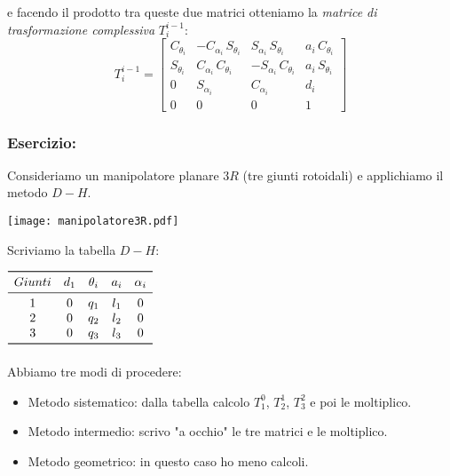 e facendo il prodotto tra queste due matrici otteniamo la \emph{matrice di trasformazione complessiva} $T_i^{i-1}$:
\begin{equation}
	T_i^{i-1} = 
	\begin{bmatrix}
		C_{\theta_i} & -C_{\alpha_i}\,S_{\theta_i} & S_{\alpha_i}\,S_{\theta_i} & a_i\,C_{\theta_i} \\
		S_{\theta_i} & C_{\alpha_i}\,C_{\theta_i} & -S_{\alpha_i}\,C_{\theta_i} & a_i\,S_{\theta_i} \\
		0 & S_{\alpha_i} & C_{\alpha_i} & d_i \\
		0 & 0 & 0 & 1
	\end{bmatrix}
\end{equation}

\subsubsection{Esercizio:}
Consideriamo un manipolatore planare $3R$ (tre giunti rotoidali) e applichiamo il metodo $D-H$.

\texttt{[image: manipolatore3R.pdf]}

Scriviamo la tabella $D-H$:\\
\begin{center}
$
\begin{array}{ccccc}
\toprule
Giunti & d_1 & \theta_i & a_i & \alpha_i \\
\midrule
1 & 0 & q_1 & l_1 & 0 \\
2 & 0 & q_2 & l_2 & 0 \\
3 & 0 & q_3 & l_3 & 0 \\
\bottomrule
\end{array}
$
\end{center}

\paragraph{}
Abbiamo tre modi di procedere:
\begin{itemize}
	\item Metodo sistematico: dalla tabella calcolo $T_1^0$, $T_2^1$, $T_3^2$ e poi le moltiplico.
	\item Metodo intermedio: scrivo "a occhio" le tre matrici e le moltiplico.
	\item Metodo geometrico: in questo caso ho meno calcoli.
\end{itemize}

